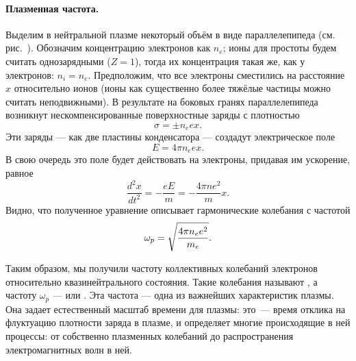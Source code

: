\paragraph{Плазменная частота.}
Выделим в нейтральной плазме некоторый объём в виде параллелепипеда
(см. рис.~).
Обозначим концентрацию электронов как $n_e$; ионы для простоты будем считать
однозарядными ($Z=1$), тогда их концентрация такая же, как у электронов: $n_i=n_e$.
Предположим, что все электроны сместились на расстояние $x$ относительно ионов
(ионы как существенно более тяжёлые частицы можно считать неподвижными).
В результате на боковых гранях параллелепипеда возникнут нескомпенсированные
поверхностные заряды с плотностью
\begin{equation*}
    \sigma = \pm n_e e x.
\end{equation*}
Эти заряды --- как две пластины конденсатора --- создадут электрическое поле
\begin{equation*}
    E=4\pi n_e e x.
\end{equation*}
В свою очередь это поле будет действовать на электроны,
придавая им ускорение, равное
\begin{equation*}
    \frac{d^2x}{dt^2}=-\frac{eE}{m}=-\frac{4\pi ne^2}{m}x.
\end{equation*}
Видно, что полученное уравнение описывает гармонические колебания с частотой
\begin{equation}
    \eqmark{plasma-freq}
    \omega_p=\sqrt{\frac{4\pi n_e e^2}{m_e}}.
\end{equation}

Таким образом, мы получили частоту коллективных колебаний
электронов относительно квазинейтрального состояния. Такие колебания
называют , а частоту $\omega_p$ ---
 или . Эта частота ---
одна из важнейших характеристик плазмы.
Она задает естественный масштаб времени для плазмы: это~--- время
отклика на флуктуацию плотности заряда в плазме,
и определяет многие происходящие в ней процессы: от собственно плазменных
колебаний до распространения электромагнитных волн в ней.


